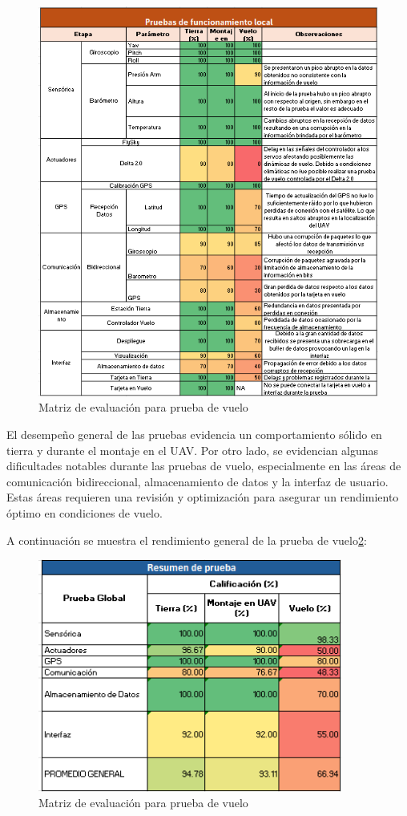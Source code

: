 \begin{figure}[H]
    \centering
    \includegraphics[width=\textwidth]{Imagenes/Pruebas/matriz_prueba_vuelo_local.png}
    \caption{Matriz de evaluación para prueba de vuelo}
    \label{fig:matriz_prueba_vuelo}
\end{figure}

El desempeño general de las pruebas evidencia un comportamiento sólido en tierra y durante el montaje en el UAV. Por otro lado, se evidencian algunas dificultades notables durante las pruebas de vuelo, especialmente en las áreas de comunicación bidireccional, almacenamiento de datos y la interfaz de usuario. Estas áreas requieren una revisión y optimización para asegurar un rendimiento óptimo en condiciones de vuelo.

A continuación se muestra el rendimiento general de la prueba de vuelo\ref{fig:resumen_prueba_vuelo}:

\begin{figure}[H]
    \centering
    \includegraphics[width=10cm]{Imagenes/Pruebas/resumen_prueba_vuelo_local.png}
    \caption{Matriz de evaluación para prueba de vuelo}
    \label{fig:resumen_prueba_vuelo}
\end{figure}